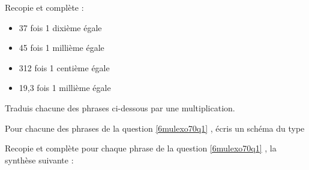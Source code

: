 \begin{myenumerate}
  \item\label{6mulexo70q1} Recopie et complète :
    \begin{itemize}
    \item 37 fois 1 dixième égale \dotfill
    \item 45 fois 1 millième égale \dotfill
    \item 312 fois 1 centième égale \dotfill
    \item 19,3 fois 1 millième égale \dotfill
    \end{itemize}
  \item Traduis chacune des phrases ci-dessous par une multiplication.
  \item Pour chacune des phrases de la question \ref{6mulexo70q1}
, écris un schéma du type
\vspace{1cm}
\begin{center}
  \kern6cm
\ncput*{$\times\dots$}
\ncput*{$\div$\ldots}
\end{center}
\vspace{5mm}
\item Recopie et complète pour chaque phrase de la question
  \ref{6mulexo70q1}
, la synthèse suivante :
\begin{center}
\end{center}
\end{myenumerate}
